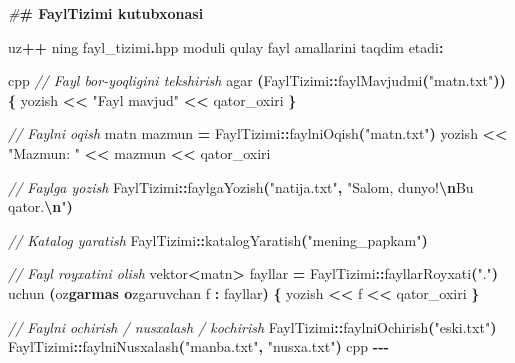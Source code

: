 \documentclass[a4paper,11pt,twoside,openright]{book}
\newenvironment{Shaded}{\begin{snugshade}}{\end{snugshade}}
\newcommand{\CharTok}[1]{\textcolor[rgb]{0.31,0.60,0.02}{#1}}
\newcommand{\CommentTok}[1]{\textcolor[rgb]{0.56,0.35,0.01}{\textit{#1}}}
\newcommand{\ErrorTok}[1]{\textcolor[rgb]{0.64,0.00,0.00}{\textbf{#1}}}
\newcommand{\NormalTok}[1]{#1}
\newcommand{\OperatorTok}[1]{\textcolor[rgb]{0.81,0.36,0.00}{\textbf{#1}}}
\newcommand{\PreprocessorTok}[1]{\textcolor[rgb]{0.56,0.35,0.01}{\textit{#1}}}
\newcommand{\SpecialCharTok}[1]{\textcolor[rgb]{0.81,0.36,0.00}{\textbf{#1}}}
\newcommand{\StringTok}[1]{\textcolor[rgb]{0.31,0.60,0.02}{#1}}
\begin{document}
\begin{Shaded}
\begin{Highlighting}[]
\PreprocessorTok{\#}\ErrorTok{\# \textasciigrave{}FaylTizimi\textasciigrave{} kutubxonasi}

\NormalTok{uz}\OperatorTok{++}\NormalTok{ ning }\ErrorTok{\textasciigrave{}}\NormalTok{fayl\_tizimi}\OperatorTok{.}\NormalTok{hpp}\ErrorTok{\textasciigrave{}}\NormalTok{ moduli qulay fayl amallarini taqdim etadi}\OperatorTok{:}

\ErrorTok{\textasciigrave{}\textasciigrave{}\textasciigrave{}}\NormalTok{cpp}
\CommentTok{// Fayl bor{-}yo\textquotesingle{}qligini tekshirish}
\NormalTok{agar }\OperatorTok{(}\NormalTok{FaylTizimi}\OperatorTok{::}\NormalTok{faylMavjudmi}\OperatorTok{(}\StringTok{"matn.txt"}\OperatorTok{))} \OperatorTok{\{}
\NormalTok{    yozish }\OperatorTok{\textless{}\textless{}} \StringTok{"Fayl mavjud"} \OperatorTok{\textless{}\textless{}}\NormalTok{ qator\_oxiri}
\OperatorTok{\}}

\CommentTok{// Faylni o\textquotesingle{}qish}
\NormalTok{matn mazmun }\OperatorTok{=}\NormalTok{ FaylTizimi}\OperatorTok{::}\NormalTok{faylniOqish}\OperatorTok{(}\StringTok{"matn.txt"}\OperatorTok{)}
\NormalTok{yozish }\OperatorTok{\textless{}\textless{}} \StringTok{"Mazmun: "} \OperatorTok{\textless{}\textless{}}\NormalTok{ mazmun }\OperatorTok{\textless{}\textless{}}\NormalTok{ qator\_oxiri}

\CommentTok{// Faylga yozish}
\NormalTok{FaylTizimi}\OperatorTok{::}\NormalTok{faylgaYozish}\OperatorTok{(}\StringTok{"natija.txt"}\OperatorTok{,} \StringTok{"Salom, dunyo!}\SpecialCharTok{\textbackslash{}n}\StringTok{Bu qator.}\SpecialCharTok{\textbackslash{}n}\StringTok{"}\OperatorTok{)}

\CommentTok{// Katalog yaratish}
\NormalTok{FaylTizimi}\OperatorTok{::}\NormalTok{katalogYaratish}\OperatorTok{(}\StringTok{"mening\_papkam"}\OperatorTok{)}

\CommentTok{// Fayl ro\textquotesingle{}yxatini olish}
\NormalTok{vektor}\OperatorTok{\textless{}}\NormalTok{matn}\OperatorTok{\textgreater{}}\NormalTok{ fayllar }\OperatorTok{=}\NormalTok{ FaylTizimi}\OperatorTok{::}\NormalTok{fayllarRoyxati}\OperatorTok{(}\StringTok{"."}\OperatorTok{)}
\NormalTok{uchun }\OperatorTok{(}\NormalTok{o}\CharTok{\textquotesingle{}z}\ErrorTok{garmas o}\CharTok{\textquotesingle{}}\NormalTok{zgaruvchan f }\OperatorTok{:}\NormalTok{ fayllar}\OperatorTok{)} \OperatorTok{\{}
\NormalTok{    yozish }\OperatorTok{\textless{}\textless{}}\NormalTok{ f }\OperatorTok{\textless{}\textless{}}\NormalTok{ qator\_oxiri}
\OperatorTok{\}}

\CommentTok{// Faylni o\textquotesingle{}chirish / nusxalash / ko\textquotesingle{}chirish}
\NormalTok{FaylTizimi}\OperatorTok{::}\NormalTok{faylniOchirish}\OperatorTok{(}\StringTok{"eski.txt"}\OperatorTok{)}
\NormalTok{FaylTizimi}\OperatorTok{::}\NormalTok{faylniNusxalash}\OperatorTok{(}\StringTok{"manba.txt"}\OperatorTok{,} \StringTok{"nusxa.txt"}\OperatorTok{)}
\ErrorTok{\textasciigrave{}\textasciigrave{}\textasciigrave{}}\NormalTok{cpp}
\OperatorTok{{-}{-}{-}}


\end{Highlighting}
\end{Shaded}
\end{document}
